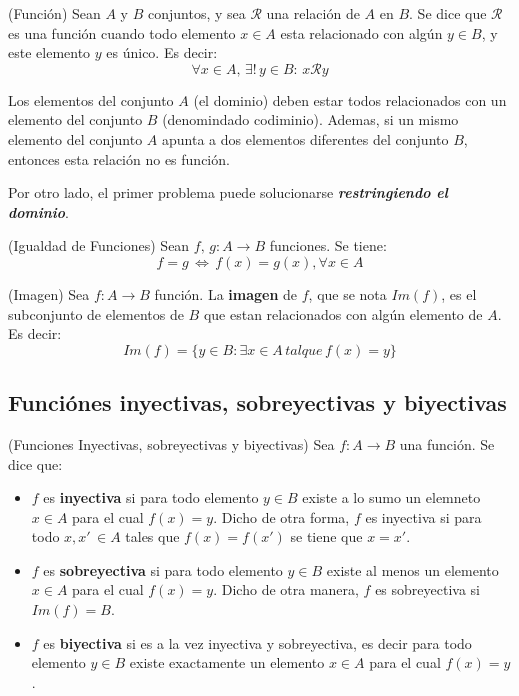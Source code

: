 \documentclass[10pt]{article}
\begin{document}
\begin{defi}(Función)
	Sean $A$ y $B$ conjuntos, y sea $\mathcal{R}$ una relación de $A$ en $B$. Se dice que $\mathcal{R}$ es una función cuando todo elemento  $x \in A$ esta relacionado con algún $y \in B$, y este elemento $y$ es único. Es decir:
	$$\forall x \in A, \, \exists ! \, y\in B: \, x\mathcal{R}y$$
\end{defi}

\begin{obs}
Los elementos del conjunto $A$ (el dominio) deben estar todos relacionados con un elemento del conjunto $B$ (denomindado codiminio). 
Ademas, si un mismo elemento del conjunto $A$ apunta a dos elementos diferentes del conjunto $B$, entonces esta relación no es función. 

Por otro lado, el primer problema puede solucionarse \textit{\textbf{restringiendo el dominio}}. 

\end{obs}


\begin{defi}(Igualdad de Funciones)
Sean $f, \, g: A \rightarrow B$ funciones. Se tiene:
	$$f = g \, \Leftrightarrow \, f(x) = g(x), \forall x \in A$$
\end{defi}

\begin{defi}(Imagen)
Sea $\! f: A \rightarrow B$ función. La \textbf{imagen} de $f$, que se nota $Im(\! f)$, es el  subconjunto de elementos de $B$ que estan relacionados con algún elemento de $A$. Es decir:
$$Im(f) = \{ y \in B: \exists x \in A \, tal que \, f(x)=y \}$$
\end{defi}

\begin{center}
\subsection{Funciónes inyectivas, sobreyectivas y biyectivas} 
\end{center}

\begin{defi}(Funciones Inyectivas, sobreyectivas y biyectivas)
Sea $f: A \rightarrow B$ una función. Se dice que:
\begin{itemize}
	\item $f$ es \textbf{inyectiva} si para todo elemento $y \in B$ existe a lo sumo un elemneto $x \in A$ para el cual $f(x)=y$. Dicho de otra forma, $f$ es inyectiva si para todo $x, x' \, \in A$ tales que $f(x) = f(x')$ se tiene que $x = x'$.
	\item $f$ es \textbf{sobreyectiva} si para todo elemento $y \in B$ existe al menos un elemento $x \in A$ para el cual $f(x) = y$. Dicho de otra manera, $f$ es sobreyectiva si $Im(f) = B$.
	\item $f$ es \textbf{biyectiva} si es a la vez inyectiva y sobreyectiva, es decir para todo elemento $y \in B$ existe exactamente un elemento $x \in A$ para el cual $f(x) = y$.
\end{itemize} 
\end{defi}
\end{document}
